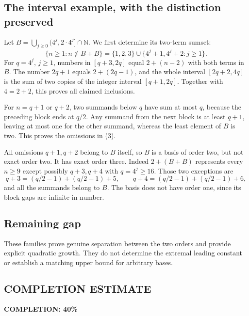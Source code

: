 \subsection*{The interval example, with the distinction preserved}
Let
$B=\bigcup_{j\ge0}(4^j,2\cdot4^j]\cap\mathbb N$.
We first determine its two-term sumset:
\[
 \{n\ge1:n\notin B+B\}
 =\{1,2,3\}\cup\{4^j+1,4^j+2:j\ge1\}. \tag{3}
\]
For $q=4^j$, $j\ge1$, numbers in $[q+3,2q]$ equal $2+(n-2)$ with both terms in $B$. The number $2q+1$ equals $2+(2q-1)$, and the whole interval $[2q+2,4q]$ is the sum of two copies of the integer interval $[q+1,2q]$. Together with $4=2+2$, this proves all claimed inclusions.

For $n=q+1$ or $q+2$, two summands below $q$ have sum at most $q$, because the preceding block ends at $q/2$. Any summand from the next block is at least $q+1$, leaving at most one for the other summand, whereas the least element of $B$ is two. This proves the omissions in (3).

All omissions $q+1,q+2$ belong to $B$ itself, so $B$ is a basis of order two, but not exact order two. It has exact order three. Indeed $2+(B+B)$ represents every $n\ge9$ except possibly $q+3,q+4$ with $q=4^j\ge16$. Those two exceptions are
\[
 q+3=(q/2-1)+(q/2-1)+5,\qquad
 q+4=(q/2-1)+(q/2-1)+6,
\]
and all the summands belong to $B$. The basis does not have order one, since its block gaps are infinite in number.

\subsection*{Remaining gap}
These families prove genuine separation between the two orders and provide explicit quadratic growth. They do not determine the extremal leading constant or establish a matching upper bound for arbitrary bases.
\subsection*{COMPLETION ESTIMATE}
\textbf{COMPLETION: 40\%}
